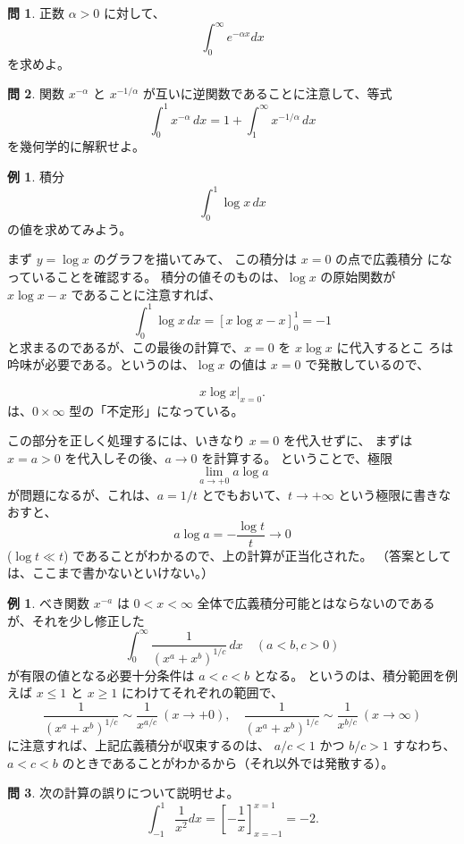 \documentclass[a4paper]{jsarticle}
\theoremstyle{definition}
\newtheorem{Example}[Theorem]{例}
\newtheorem{Exercise}{問}%
\theoremstyle{remark}
\begin{document}
\begin{Exercise}
正数 $\alpha>0$ に対して、
\[
\int_0^\infty e^{-\alpha x}dx
\]
を求めよ。
\end{Exercise}

\begin{Exercise}
  関数 $x^{-\alpha}$ と $x^{-1/\alpha}$ が互いに逆関数であることに注意して、等式
  \[
    \int_0^1 x^{-\alpha}\, dx = 1 + \int_1^\infty x^{-1/\alpha}\, dx
  \]
  を幾何学的に解釈せよ。
\end{Exercise}

\begin{Example}
積分
\[
\int_0^1 \log x\,dx
\]
の値を求めてみよう。

まず $y = \log x$ のグラフを描いてみて、
この積分は $x=0$ の点で広義積分
になっていることを確認する。
積分の値そのものは、$\log x$ の原始関数が
$x\log x - x$ であることに注意すれば、
\[
\int_0^1 \log x\,dx = [x\log x -x]_0^1 = -1
\]
と求まるのであるが、この最後の計算で、$x=0$ を $x\log x$ に代入するとこ
ろは
吟味が必要である。というのは、$\log x$ の値は $x=0$ で発散しているので、

\[
x\log x\bigl|_{x=0}\bigr.
\]
は、$0\times\infty$ 型の「不定形」になっている。

この部分を正しく処理するには、いきなり $x=0$ を代入せずに、
まずは $x=a>0$ を代入しその後、$a \to 0$ を計算する。
ということで、極限
\[
\lim_{a\to +0} a\log a
\]
が問題になるが、これは、$a = 1/t$ とでもおいて、$t \to +\infty$
という極限に書きなおすと、
\[
a\log a = -\frac{\log t}{t} \to 0
\]
($\log t \ll t$) であることがわかるので、上の計算が正当化された。
（答案としては、ここまで書かないといけない。）
\end{Example}

\begin{Example}
  べき関数 $x^{-a}$ は $0 < x < \infty$ 全体で広義積分可能とはならないのであるが、それを少し修正した
  \[
    \int_0^\infty \frac{1}{(x^a + x^b)^{1/c}}\, dx
    \quad (a < b, c > 0) 
  \]
  が有限の値となる必要十分条件は $a < c < b$ となる。
  というのは、積分範囲を例えば $x\leq 1$ と $x \geq 1$ にわけてそれぞれの範囲で、
  \[
    \frac{1}{(x^a + x^b)^{1/c}} \sim \frac{1}{x^{a/c}}\ (x \to +0),
    \quad
    \frac{1}{(x^a + x^b)^{1/c}} \sim \frac{1}{x^{b/c}}\ (x \to \infty)
  \]
  に注意すれば、上記広義積分が収束するのは、
  $a/c < 1$ かつ $b/c > 1$ すなわち、$a < c < b$ のときであることがわかるから（それ以外では発散する）。
\end{Example}


\bigskip
\begin{Exercise}
次の計算の誤りについて説明せよ。
\[
\int_{-1}^1 \frac{1}{x^2} dx = \left[ - \frac{1}{x} \right]_{x=-1}^{x=1}
= -2.
\]
\end{Exercise}
\end{document}
